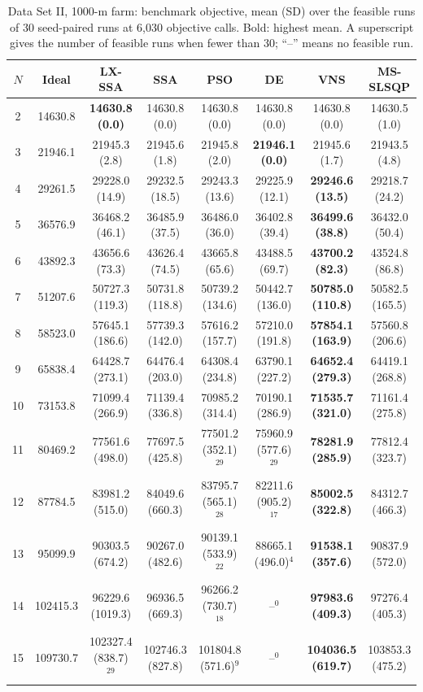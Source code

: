 \begin{table}[!t]
\centering
\caption{Data Set II, 1000-m farm: benchmark objective, mean (SD) over the feasible runs of 30 seed-paired runs at 6,030 objective calls. Bold: highest mean. A superscript gives the number of feasible runs when fewer than 30; ``--'' means no feasible run.}
\label{tab:res-2-1000}
\scriptsize\setlength{\tabcolsep}{3pt}
\begin{tabular}{cccccccc}
\toprule
$N$ & Ideal & LX-SSA & SSA & PSO & DE & VNS & MS-SLSQP \\
\midrule
2 & 14630.8 & \textbf{14630.8 (0.0)} & 14630.8 (0.0) & 14630.8 (0.0) & 14630.8 (0.0) & 14630.8 (0.0) & 14630.5 (1.0) \\
3 & 21946.1 & 21945.3 (2.8) & 21945.6 (1.8) & 21945.8 (2.0) & \textbf{21946.1 (0.0)} & 21945.6 (1.7) & 21943.5 (4.8) \\
4 & 29261.5 & 29228.0 (14.9) & 29232.5 (18.5) & 29243.3 (13.6) & 29225.9 (12.1) & \textbf{29246.6 (13.5)} & 29218.7 (24.2) \\
5 & 36576.9 & 36468.2 (46.1) & 36485.9 (37.5) & 36486.0 (36.0) & 36402.8 (39.4) & \textbf{36499.6 (38.8)} & 36432.0 (50.4) \\
6 & 43892.3 & 43656.6 (73.3) & 43626.4 (74.5) & 43665.8 (65.6) & 43488.5 (69.7) & \textbf{43700.2 (82.3)} & 43524.8 (86.8) \\
7 & 51207.6 & 50727.3 (119.3) & 50731.8 (118.8) & 50739.2 (134.6) & 50442.7 (136.0) & \textbf{50785.0 (110.8)} & 50582.5 (165.5) \\
8 & 58523.0 & 57645.1 (186.6) & 57739.3 (142.0) & 57616.2 (157.7) & 57210.0 (191.8) & \textbf{57854.1 (163.9)} & 57560.8 (206.6) \\
9 & 65838.4 & 64428.7 (273.1) & 64476.4 (203.0) & 64308.4 (234.8) & 63790.1 (227.2) & \textbf{64652.4 (279.3)} & 64419.1 (268.8) \\
10 & 73153.8 & 71099.4 (266.9) & 71139.4 (336.8) & 70985.2 (314.4) & 70190.1 (286.9) & \textbf{71535.7 (321.0)} & 71161.4 (275.8) \\
11 & 80469.2 & 77561.6 (498.0) & 77697.5 (425.8) & 77501.2 (352.1)$^{29}$ & 75960.9 (577.6)$^{29}$ & \textbf{78281.9 (285.9)} & 77812.4 (323.7) \\
12 & 87784.5 & 83981.2 (515.0) & 84049.6 (660.3) & 83795.7 (565.1)$^{28}$ & 82211.6 (905.2)$^{17}$ & \textbf{85002.5 (322.8)} & 84312.7 (466.3) \\
13 & 95099.9 & 90303.5 (674.2) & 90267.0 (482.6) & 90139.1 (533.9)$^{22}$ & 88665.1 (496.0)$^{4}$ & \textbf{91538.1 (357.6)} & 90837.9 (572.0) \\
14 & 102415.3 & 96229.6 (1019.3) & 96936.5 (669.3) & 96266.2 (730.7)$^{18}$ & --$^{0}$ & \textbf{97983.6 (409.3)} & 97276.4 (405.3) \\
15 & 109730.7 & 102327.4 (838.7)$^{29}$ & 102746.3 (827.8) & 101804.8 (571.6)$^{9}$ & --$^{0}$ & \textbf{104036.5 (619.7)} & 103853.3 (475.2) \\
\bottomrule
\end{tabular}
\end{table}

